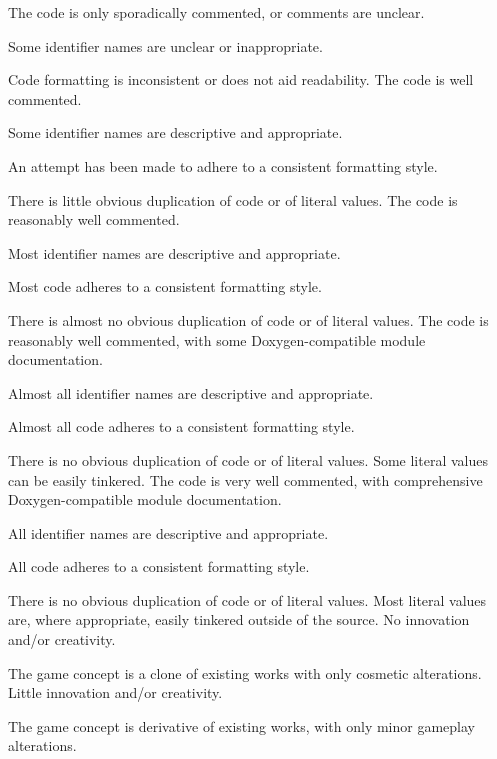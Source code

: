 \documentclass{../fal_assignment}
\begin{document}
\begin{markingrubric}
        \grade The code is only sporadically commented, or comments are unclear.
            \par Some identifier names are unclear or inappropriate.
            \par Code formatting is inconsistent or does not aid readability.
        \grade The code is well commented.
            \par Some identifier names are descriptive and appropriate.
            \par An attempt has been made to adhere to a consistent formatting style.
             \par There is little obvious duplication of code or of literal values.           
        \grade The code is reasonably well commented.
            \par Most identifier names are descriptive and appropriate.
            \par Most code adheres to a consistent formatting style.
             \par There is almost no obvious duplication of code or of literal values.   
        \grade The code is reasonably well commented, with some Doxygen-compatible module documentation.
            \par Almost all identifier names are descriptive and appropriate.
            \par Almost all code adheres to a consistent formatting style.
             \par There is no obvious duplication of code or of literal values. Some literal values can be easily tinkered. 
        \grade The code is very well commented, with comprehensive Doxygen-compatible module documentation.
            \par All identifier names are descriptive and appropriate.
            \par All code adheres to a consistent formatting style.
             \par There is no obvious duplication of code or of literal values. Most literal values are, where appropriate, easily tinkered outside of the source.  
        \grade\fail No innovation and/or creativity.
            \par The game concept is a clone of existing works with only cosmetic alterations.
        \grade Little innovation and/or creativity.
            \par The game concept is derivative of existing works, with only minor gameplay alterations.

\end{markingrubric}
\end{document}
